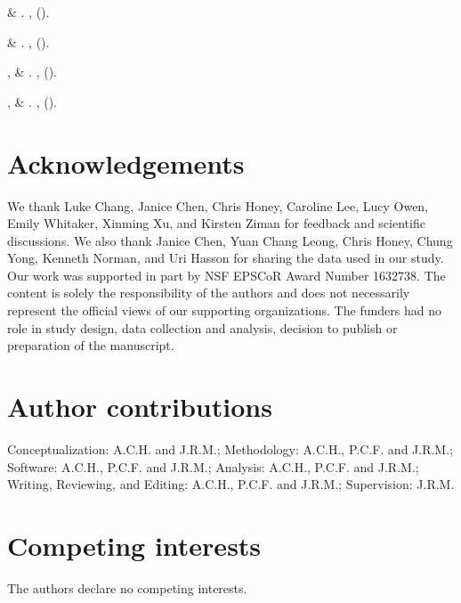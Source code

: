 \documentclass[10pt]{article}
\begin{document}
\begin{thebibliography}{10}
 \& 
\newblock {}.
\newblock \emph{}
  \textbf{}, 
  ().

 \& 
\newblock {}.
\newblock \emph{} \textbf{},
   ().

,  \&
\newblock {}.
\newblock \emph{} \textbf{},
   ().

,  \&
\newblock {}.
\newblock \emph{}
  \textbf{}, 
  ().

\end{thebibliography}



\section*{Acknowledgements}
We thank Luke Chang, Janice Chen, Chris Honey, Caroline Lee, Lucy Owen, Emily Whitaker, Xinming Xu, and Kirsten Ziman for feedback and scientific discussions. We also thank Janice Chen, Yuan Chang Leong, Chris Honey, Chung Yong, Kenneth Norman, and Uri Hasson for sharing the data used in our study.  Our work was supported in part by NSF EPSCoR Award Number 1632738. The content is solely the responsibility of the authors and does not necessarily represent the official views of our supporting organizations.  The funders had no role in study design, data collection and analysis, decision to publish or preparation of the manuscript.

\section*{Author contributions}
Conceptualization: A.C.H. and J.R.M.; Methodology: A.C.H., P.C.F. and J.R.M.; Software: A.C.H., P.C.F. and J.R.M.; Analysis: A.C.H., P.C.F. and J.R.M.; Writing, Reviewing, and Editing: A.C.H., P.C.F. and J.R.M.; Supervision: J.R.M.

\section*{Competing interests}
The authors declare no competing interests.
\end{document}
